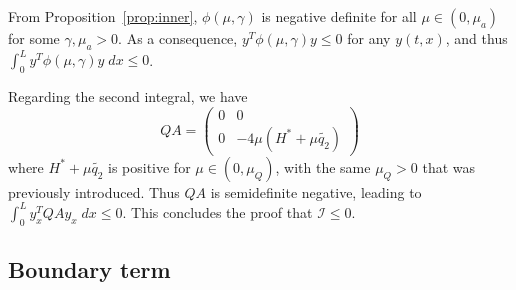 \documentclass[11pt]{article}
\begin{document}
From Proposition~\ref{prop:inner}, $\phi(\mu, \gamma)$ is negative definite for all $\mu \in (0, {\mu_a})$ for some $\gamma, {\mu_a} > 0$. As a consequence, $y^T \phi(\mu, \gamma) y \leq 0$ for any $y(t,x)$, and thus $\int_0^L y^T \phi(\mu, \gamma) y \; dx \leq 0$.

Regarding the second integral, we have \[QA = \begin{pmatrix}0 & 0 \\ 0 & -4\mu(H^{*} + \mu \tilde{q_2})\end{pmatrix}\] where $H^* + \mu \tilde{q_2}$ is positive for $\mu \in (0, \mu_Q)$, with the same $\mu_Q > 0$ that was previously introduced. Thus $QA$ is semidefinite negative, leading to $\int_0^L y^T_x QA y_x \; dx \leq 0$. This concludes the proof that $\mathcal{I} \leq 0$.

\subsection{Boundary term}
\label{ssec:bound}
\end{document}
